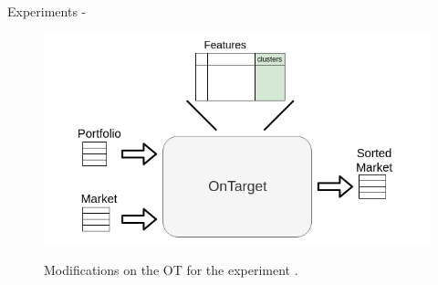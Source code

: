 
\begin{frame}{Experiments - \fullNameExperimentII{}}
    \begin{figure}
        \centering
        \includegraphics[width=\linewidth]{fig/ch3-clusters-as-features.png}
        \label{fig:clusters-as-features}
        \caption{Modifications on the OT for the experiment \nameExperimentII{}.} 
    \end{figure}
\end{frame}